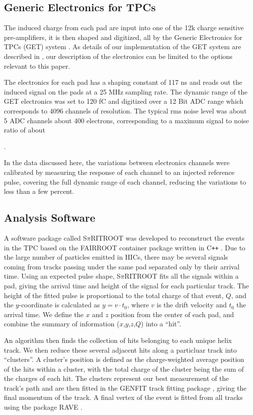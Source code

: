 \documentclass[review,number,sort&compress]{elsarticle}
\begin{document}
\subsection{Generic Electronics for TPCs}
The induced charge from each pad are input into one of the 12k charge sensitive pre-amplifiers, it is then shaped and digitized, all by the Generic Electronics for TPCs (GET) system \cite{get}. As details of our implementation of the GET system are described in \citep{aki}, our description of the electronics can be limited to the options relevant to this paper.

The electronics for each pad has a shaping constant of 117 ns and reads out the induced signal on the pads at a 25 MHz sampling rate. The dynamic range of the GET electronics was set to 120 fC and digitized over a 12 Bit ADC range which corresponds to 4096 channels of resolution. The typical rms noise level was about 5 ADC channels about 400 electrons, corresponding to a maximum signal to noise ratio of about 

. 

In the data discussed here, the variations between electronics channels were calibrated by measuring the response of each channel to an injected reference pulse, covering the full dynamic range of each channel, reducing the variations to less than a few percent.
 
\subsection{Analysis Software}
A software package called S$\pi$RITROOT was developed to reconstruct the events in the TPC based on the FAIRROOT container package written in C\texttt{++} \cite{fairroot}. Due to the large number of particles emitted in HICs, there may be several signals coming from tracks passing under the same pad separated only by their arrival time. Using an expected pulse shape, S$\pi$RITROOT fits all the signals within a pad, giving the arrival time and height of the signal for each particular track. The height of the fitted pulse is proportional to the total charge of that event, $Q$, and the $y$-coordinate is calculated as $y = v\cdot t_0$, where $v$ is the drift velocity and $t_0$ the arrival time. We define the $x$ and $z$ position from the center of each pad, and combine the summary of information ($x$,$y$,$z$,$Q$) into a ``hit''. 

 An algorithm then finds the collection of hits belonging to each unique helix track. We then reduce these several adjacent hits along a particluar track into ``clusters''. A cluster's position is defined as the charge-weighted average position of the hits within a cluster, with the total charge of the cluster being the sum of the charges of each hit. The clusters represent our best measurement of the track's path and are then fitted in the GENFIT track fitting package \cite{genfit}, giving the final momentum of the track. A final vertex of the event is fitted from all tracks using the package RAVE \cite{rave}. 
 
\end{document}
